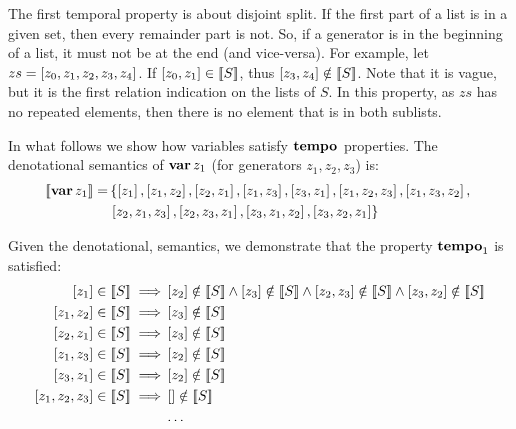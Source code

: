 \documentclass[12pt,openright,twoside,a4paper,oldfontcommands,english,brazil,final]{abntex2}
\theoremstyle{theo}
\def\varop{\ensuremath\operatorname{\mathbf{var}}}
\newcommand{\var}[1]{\ensuremath\varop #1}
\def\tempoop{\ensuremath\operatorname{\mathbf{tempo}}}
\newcommand{\tempo}[2][1-4]{\ensuremath\tempoop_{#1} #2}
\newcommand{\listsin}[1]{\ensuremath\left[ #1 \right]}
\newcommand{\denote}[1]{\ensuremath\left[\!\left[#1\right]\!\right]}
\begin{document}
The first temporal property is about disjoint split.
If the first part of a list is in a given set, then every remainder part is not.
So, if a generator is in the beginning of a list, it must not be at the end (and vice-versa).
For example, let $zs = \listsin{z_0,z_1,z_2,z_3,z_4}$.
If $\listsin{z_0,z_1} \in \denote{S}$, thus $\listsin{z_3,z_4} \notin \denote{S}$.
Note that it is vague, but it is the first relation indication on the lists of $S$.
In this property, as $zs$ has no repeated elements, then there is no element that is in both sublists.

In what follows we show how variables satisfy $\tempo[]{}$ properties.
The denotational semantics of $\var{z_1}$ (for generators $z_1,z_2,z_3$) is:
%
\begin{align}
\denote{\var{z_1}} = & 
  \left\{
  \listsin{z_1}, 
  \listsin{z_1,z_2},\listsin{z_2,z_1},
  \listsin{z_1,z_3},\listsin{z_3,z_1},
  \listsin{z_1,z_2,z_3},\listsin{z_1,z_3,z_2},
  \right.
  \nonumber\\
  &
  \left.
  \listsin{z_2,z_1,z_3},\listsin{z_2,z_3,z_1},
  \listsin{z_3,z_1,z_2},\listsin{z_3,z_2,z_1}
  \right\}
\end{align}

Given the denotational, semantics, we demonstrate that the property $\tempo[1]{}$ is satisfied:
\begin{align}
\listsin{z_1} \in \denote{S} \implies & 
  \listsin{z_2} \notin \denote{S} \land
  \listsin{z_3} \notin \denote{S} \land
  \listsin{z_2,z_3}\notin \denote{S} \land
  \listsin{z_3,z_2}\notin \denote{S}\nonumber\\
\listsin{z_1,z_2} \in \denote{S} \implies &
  \listsin{z_3} \notin \denote{S}\nonumber\\
\listsin{z_2,z_1} \in \denote{S} \implies &
  \listsin{z_3} \notin \denote{S}\nonumber\\
\listsin{z_1,z_3} \in \denote{S} \implies &
  \listsin{z_2} \notin \denote{S}\nonumber\\
\listsin{z_3,z_1} \in \denote{S} \implies &
  \listsin{z_2} \notin \denote{S}\nonumber\\
\listsin{z_1,z_2,z_3} \in \denote{S} \implies &
  \listsin{} \notin \denote{S}\nonumber\\
&\ldots\nonumber
\end{align}
\end{document}
